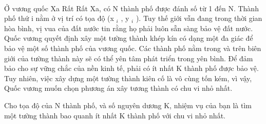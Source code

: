  

Ở vương quốc Xa Rất Rất Xa, có N thành phố được đánh số từ 1 đến N. Thành phố thứ i nằm ở vị trí có tọa độ (x $_ i $ , y $_ i $ ). Tuy thế giới vẫn đang trong thời gian hòa bình, vị vua của đất nước tin rằng họ phải luôn sẵn sàng bảo vệ đất nước. Quốc vương quyết định xây một tường thành khép kín có dạng một đa giác để bảo vệ một số thành phố của vương quốc. Các thành phố nằm trong và trên biên giới của tường thành này sẽ có thể yên tâm phát triển trong yên bình. Để đảm bảo cho sự vững chắc của nền kinh tế, phải có ít nhất K thành phố được bảo vệ. Tuy nhiên, việc xây dựng một tường thành kiên cố là vô cùng tốn kém, vì vậy, Quốc vương muốn chọn phương án xây tương thành có chu vi nhỏ nhất.

Cho tọa độ của N thành phố, và số nguyên dương K, nhiệm vụ của bạn là tìm một tường thành bao quanh ít nhất K thành phố với chu vi nhỏ nhất.